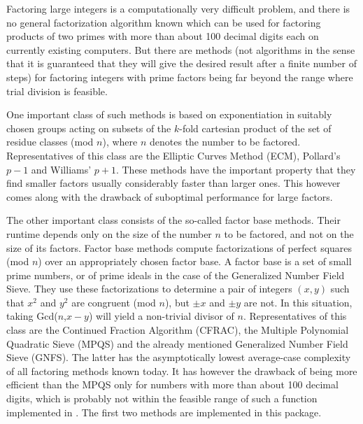 

Factoring large integers is a computationally very difficult problem,
and there is no general factorization algorithm known which can be used
for factoring products of two primes with more than about 100 decimal
digits each on currently existing computers. But there are methods
(not algorithms in the sense that it is guaranteed that they will give
the desired result after a finite number of steps) for factoring integers
with prime factors being far beyond the range where trial division is
feasible.

One important class of such methods is based on exponentiation in
suitably chosen groups acting on subsets of the $k$-fold cartesian
product of the set of residue classes (mod $n$), where $n$ denotes the
number to be factored.
Representatives of this class are the Elliptic Curves Method (ECM),
Pollard's $p-1$ and Williams' $p+1$.
These methods have the important property that they find smaller
factors usually considerably faster than larger ones.
This however comes along with the drawback of suboptimal performance
for large factors.

The other important class consists of the so-called factor base methods.
Their runtime depends only on the size of the number $n$ to be factored,
and not on the size of its factors.
Factor base methods compute factorizations of perfect squares (mod $n$)
over an appropriately chosen factor base.
A factor base is a set of small prime numbers, or of
prime ideals in the case of the
Generalized Number Field Sieve.
They use these factorizations to determine a pair of integers $(x,y)$
such that $x^2$ and $y^2$ are congruent (mod $n$), but $\pm x$ and
$\pm y$ are not. In this situation, taking Gcd($n$,$x-y$) will yield
a non-trivial divisor of $n$.
Representatives of this class are the Continued Fraction Algorithm
(CFRAC), the Multiple Polynomial Quadratic Sieve (MPQS) and the
already mentioned Generalized Number Field Sieve (GNFS). The latter has
the asymptotically lowest average-case complexity of all factoring
methods known today. It has however the drawback of being more efficient
than the MPQS only for numbers with more than about 100 decimal digits,
which is probably not within the feasible range of such a function
implemented in {\GAP}.
The first two methods are implemented in this package.

